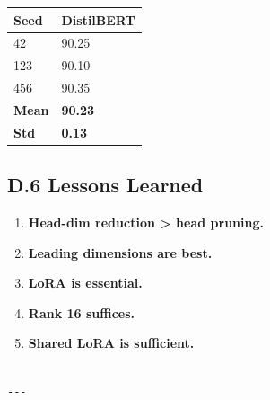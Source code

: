 \begin{table}[H]
\centering
\small
\begin{tabular}{ll}
\toprule
\textbf{Seed} & \textbf{DistilBERT} \\
\midrule
42 & 90.25 \\
123 & 90.10 \\
456 & 90.35 \\
\textbf{Mean} & \textbf{90.23} \\
\textbf{Std} & \textbf{0.13} \\
\bottomrule
\end{tabular}
\end{table}

\subsection{D.6 Lessons Learned}

\begin{enumerate}
\item \textbf{Head-dim reduction > head pruning.}
\item \textbf{Leading dimensions are best.}
\item \textbf{LoRA is essential.}
\item \textbf{Rank 16 suffices.}
\item \textbf{Shared LoRA is sufficient.}
\end{enumerate}
\begin{lstlisting}

---
\end{lstlisting}